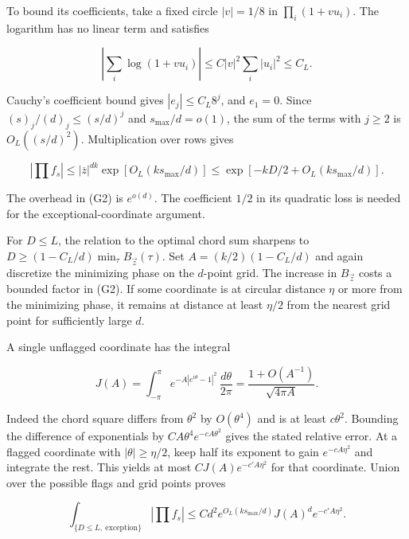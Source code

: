 To bound its coefficients, take a fixed circle $|v|=1/8$ in $\prod_i(1+v u_i)$. The logarithm has no linear term and satisfies

\begin{equation*}
\left|\sum_i \log(1+v u_i)\right|
\le C |v|^2\sum_i|u_i|^2\le C_L.
\end{equation*}

Cauchy's coefficient bound gives $|e_j|\le C_L8^j$, and $e_1=0$. Since $(s)_j/(d)_j\le(s/d)^j$ and $s_{\max}/d=o(1)$, the sum of the terms with $j\ge2$ is $O_L((s/d)^2)$. Multiplication over rows gives

\begin{equation}
\left|\prod f_s\right|
\le |\overline z|^{dk}\exp[O_L(k s_{\max}/d)]
\le \exp[-kD/2+O_L(k s_{\max}/d)].
\tag{G2}
\end{equation}

The overhead in (G2) is $e^{o(d)}$. The coefficient $1/2$ in its quadratic loss is needed for the exceptional-coordinate argument.

For $D\le L$, the relation to the optimal chord sum sharpens to $D\ge(1-C_L/d)\min_\tau B_{\vec z}(\tau)$. Set $A=(k/2)(1-C_L/d)$ and again discretize the minimizing phase on the $d$-point grid. The increase in $B_{\vec z}$ costs a bounded factor in (G2). If some coordinate is at circular distance $\eta$ or more from the minimizing phase, it remains at distance at least $\eta/2$ from the nearest grid point for sufficiently large $d$.

A single unflagged coordinate has the integral

\begin{equation*}
J(A)=\int_{-\pi}^{\pi}e^{-A|e^{i\theta}-1|^2}\,\frac{d\theta}{2\pi}
=\frac{1+O(A^{-1})}{\sqrt{4\pi A}}.
\end{equation*}

Indeed the chord square differs from $\theta^2$ by $O(\theta^4)$ and is at least $c\theta^2$. Bounding the difference of exponentials by $C A\theta^4e^{-cA\theta^2}$ gives the stated relative error. At a flagged coordinate with $|\theta|\ge\eta/2$, keep half its exponent to gain $e^{-cA\eta^2}$ and integrate the rest. This yields at most $C J(A)e^{-c'A\eta^2}$ for that coordinate. Union over the possible flags and grid points proves

\begin{equation*}
\int_{\{D\le L,\ \mathrm{exception}\}}\left|\prod f_s\right|
\le C d^2 e^{O_L(k s_{\max}/d)} J(A)^d e^{-c' A\eta^2}.
\end{equation*}

